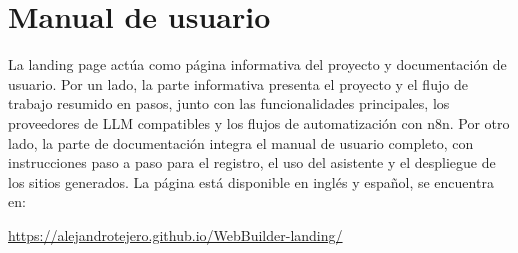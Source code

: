 
\cleardoublepage
\appendix

\chapter{Manual de usuario}
\label{app:manual}

La landing page actúa como página informativa del proyecto y documentación de usuario. Por un lado, la parte informativa presenta el proyecto y el flujo de trabajo resumido en pasos, junto con las funcionalidades principales, los proveedores de LLM compatibles y los flujos de automatización con n8n. Por otro lado, la parte de documentación integra el manual de usuario completo, con instrucciones paso a paso para el registro, el uso del asistente y el despliegue de los sitios generados. La página está disponible en inglés y español, se encuentra en:

\begin{center}
\url{https://alejandrotejero.github.io/WebBuilder-landing/}
\end{center}